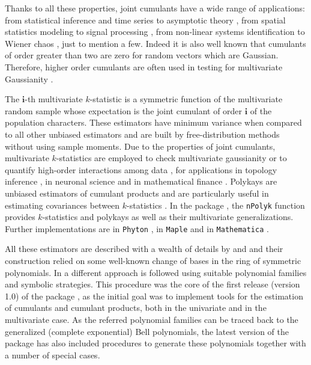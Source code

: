 Thanks to all these properties, joint cumulants have a wide range of
applications: from statistical inference and time series
\citep{MR2303087} to asymptotic theory \citep{rao1999some}, from spatial
statistics modeling \citep{MR2576676} to signal processing
\citep{1458151}, from non-linear systems identification
\citep{systems9020046} to Wiener chaos \citep{Peccati}, just to mention
a few. Indeed it is also well known that cumulants of order greater than
two are zero for random vectors which are Gaussian. Therefore, higher
order cumulants are often used in testing for multivariate Gaussianity
\citep{MR2303087}.

The \(\boldsymbol{i}\)-th multivariate \(k\)-statistic is a symmetric
function of the multivariate random sample whose expectation is the
joint cumulant of order \(\boldsymbol{i}\) of the population characters.
These estimators have minimum variance when compared to all other
unbiased estimators and are built by free-distribution methods without
using sample moments. Due to the properties of joint cumulants,
multivariate \(k\)-statistics are employed to check multivariate
gaussianity \citep{ferreira1997cumulants} or to quantify high-order
interactions among data \citep{6100593}, for applications in topology
inference \citep{9754714}, in neuronal science \citep{MR2721349} and in
mathematical finance \citep{MR4129101}. Polykays are unbiased estimators
of cumulant products \citep{robson1957applications} and are particularly
useful in estimating covariances between \(k\)-statistics
\citep{MR907286}. In the  package \citep{packkS1},
the \texttt{nPolyk} function provides \(k\)-statistics and polykays as
well as their multivariate generalizations. Further implementations are
in \texttt{Phyton} \citep{smith2020tutorial}, in \texttt{Maple}
\citep{DG} and in \texttt{Mathematica} \citep{MR1890491}.

All these estimators are described with a wealth of details by
\citet{MR1280717} and \citet{MR907286} and their construction relied on
some well-known change of bases in the ring of symmetric polynomials. In
\citet{MR3437172} a different approach is followed using suitable
polynomial families and symbolic strategies. This procedure was the core
of the first release (version 1.0) of the  package
\citep{packkS}, as the initial goal was to implement tools for the
estimation of cumulants and cumulant products, both in the univariate
and in the multivariate case. As the referred polynomial families can be
traced back to the generalized (complete exponential) Bell polynomials,
the latest version of the package \citep{packkS1} has also included
procedures to generate these polynomials together with a number of
special cases.

